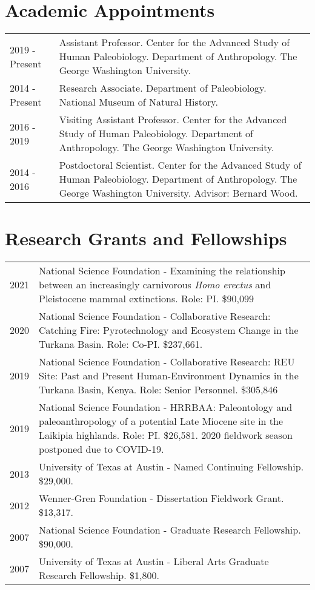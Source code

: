 \documentclass{article}
\begin{document}
\section*{Academic Appointments}
\begin{tabular}{p{}p{}}
2019 - Present & Assistant Professor. Center for the Advanced Study of Human Paleobiology. Department of Anthropology. The George Washington University.\\[4pt]
2014 - Present & Research Associate. Department of Paleobiology.  National Museum of Natural History.\\
2016 - 2019 & Visiting Assistant Professor. Center for the Advanced Study of Human Paleobiology. Department of Anthropology. The George Washington University.\\[4pt]
2014 - 2016 & Postdoctoral Scientist. Center for the Advanced Study of Human Paleobiology. Department of Anthropology. The George Washington University. Advisor: Bernard Wood.\\[4pt]
\end{tabular} 

\section*{Research Grants and Fellowships}
\begin{tabular}{p{}p{}}
2021 & National Science Foundation - Examining the relationship between an increasingly carnivorous \emph{Homo erectus} and Pleistocene mammal extinctions. Role: PI. \$90,099\\[4pt]
2020 & National Science Foundation - Collaborative Research: Catching Fire: Pyrotechnology and Ecosystem Change in the Turkana Basin. Role: Co-PI. \$237,661.\\[4pt]
2019 &  National Science Foundation - Collaborative Research: REU Site: Past and Present Human-Environment Dynamics in the Turkana Basin, Kenya. Role: Senior Personnel. \$305,846\\[4pt]
2019 & National Science Foundation - HRRBAA: Paleontology and paleoanthropology of a potential Late Miocene site in the Laikipia highlands. Role: PI. \$26,581. 2020 fieldwork season postponed due to COVID-19. \\[4pt]
2013 &  University of Texas at Austin - Named Continuing Fellowship. \$29,000.\\[4pt]
2012  & Wenner-Gren Foundation - Dissertation Fieldwork Grant. \$13,317.\\[4pt]
2007 &  National Science Foundation - Graduate Research Fellowship. \$90,000.\\[4pt]
2007 &  University of Texas at Austin - Liberal Arts Graduate Research Fellowship. \$1,800.\\[4pt]

\end{tabular}
\end{document}
